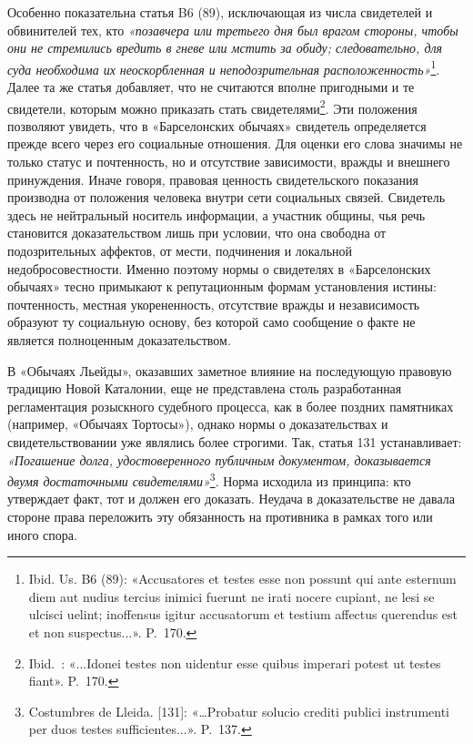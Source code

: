 Особенно показательна статья B6 (89), исключающая из числа свидетелей и обвинителей тех, кто \emph{«позавчера или третьего дня был врагом стороны, чтобы они не стремились вредить в гневе или мстить за обиду; следовательно, для суда необходима их неоскорбленная и неподозрительная расположенность»}\footnote{Ibid. Us. B6 (89): «Accusatores et testes esse non possunt qui ante esternum diem aut nudius tercius inimici fuerunt ne irati nocere cupiant, ne lesi se ulcisci uelint; inoffensus igitur accusatorum et testium affectus querendus est et non suspectus...». P.~170.}. Далее та же статья добавляет, что не считаются вполне пригодными и те свидетели, которым можно приказать стать свидетелями\footnote{Ibid.~: «...Idonei testes non uidentur esse quibus imperari potest ut testes fiant». P.~170.}. Эти положения позволяют увидеть, что в «Барселонских обычаях» свидетель определяется прежде всего через его социальные отношения. Для оценки его слова значимы не только статус и почтенность, но и отсутствие зависимости, вражды и внешнего принуждения. Иначе говоря, правовая ценность свидетельского показания производна от положения человека внутри сети социальных связей. Свидетель здесь не нейтральный носитель информации, а участник общины, чья речь становится доказательством лишь при условии, что она свободна от подозрительных аффектов, от мести, подчинения и локальной недобросовестности. Именно поэтому нормы о свидетелях в «Барселонских обычаях» тесно примыкают к репутационным формам установления истины: почтенность, местная укорененность, отсутствие вражды и независимость образуют ту социальную основу, без которой само сообщение о факте не является полноценным доказательством.

В «Обычаях Льейды», оказавших заметное влияние на последующую правовую традицию Новой Каталонии, еще не представлена столь разработанная регламентация розыскного судебного процесса, как в более поздних памятниках (например, «Обычаях Тортосы»), однако нормы о доказательствах и свидетельствовании уже являлись более строгими. Так, статья 131 устанавливает: \emph{«Погашение долга, удостоверенного публичным }\emph{документом, доказывается двумя достаточными свидетелями»}\footnote{Costumbres de Lleida. [131]: «…Probatur solucio crediti publici instrumenti per duos testes sufficientes...». P.~137.}. Норма исходила из принципа: кто утверждает факт, тот и должен его доказать. Неудача в доказательстве не давала стороне права переложить эту обязанность на противника в рамках того или иного спора.

